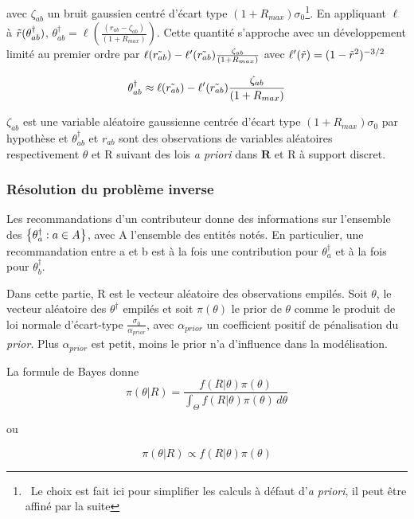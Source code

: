 avec $\zeta_{ab}$ un bruit gaussien centré d'écart type $(1+R_{max})\sigma_0$\footnote{~Le choix est fait ici pour simplifier les calculs à défaut d'\textit{a priori}, il peut être affiné par la suite}.
En appliquant $\ell$ à $\Tilde{r}(\theta_{ab}^\dagger)$, $\theta_{ab}^\dagger = \ell (\frac{( r_{ab}-\zeta_{ab})}{(1+R_{max})})$.
Cette quantité s'approche avec un développement limité au premier ordre par $\ell(\Tilde{r_{ab}}) - \ell'(\Tilde{r_{ab}})\frac{\zeta_{ab}}{(1+R_{max})}$ avec $\ell'(\Tilde{r})=(1-\Tilde{r}^2)^{-3/2}$

\begin{equation}
    \theta_{ab}^\dagger \approx \ell(\Tilde{r_{ab}}) - \ell'(\Tilde{r_{ab}})\frac{\zeta_{ab}}{(1+R_{max})}
\end{equation}

$\zeta_{ab}$ est une variable aléatoire gaussienne centrée d'écart type $(1+R_{max})\sigma_0$  par hypothèse
et $\theta_{ab}^\dagger$ et $r_{ab}$ sont des observations de variables aléatoires respectivement $\theta$ et R suivant des lois \textit{a priori} dans $\mathbf{R}$ et R à support discret.

\subsubsection{Résolution du problème inverse}

Les recommandations d'un contributeur donne des informations sur l'ensemble des $\left\lbrace \theta^\dagger_a : a \in A \right\rbrace$, avec A l'ensemble des entités notés.
En particulier, une recommandation entre a et b est à la fois une contribution pour $\theta^\dagger_a$ et à la fois pour $\theta^\dagger_b$.

Dans cette partie, R est le vecteur aléatoire des observations empilés.
Soit $\theta$, le vecteur aléatoire des $\theta^\dagger$ empilés
et soit $\pi(\theta)$ le prior de $\theta$ comme le produit de loi normale d'écart-type $\frac{\sigma_0}{\alpha_{prior}}$, avec $\alpha_{prior}$ un coefficient positif de pénalisation du \textit{prior}. Plus $\alpha_{prior}$ est petit, moins le prior n'a d'influence dans la modélisation.

La formule de Bayes donne  
\begin{equation}
\pi(\theta|R) = \frac{f(R|\theta)\pi(\theta)}
{\int_{\Theta} f(R|\theta)\pi(\theta) \,d\theta }
\end{equation}

ou  

\begin{equation}
\pi(\theta|R) \propto f(R|\theta)\pi(\theta)
\end{equation}

